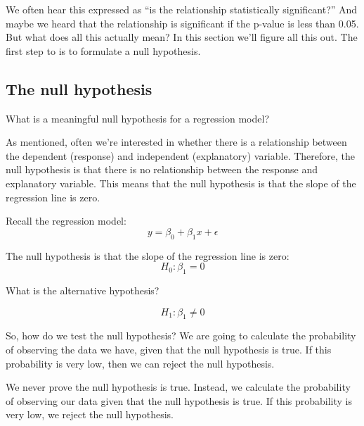 \documentclass[
  letterpaper,
  8pt,
  a4paper]{book}
\begin{document}
We often hear this expressed as ``is the relationship statistically
significant?'' And maybe we heard that the relationship is significant
if the p-value is less than 0.05. But what does all this actually mean?
In this section we'll figure all this out. The first step to is to
formulate a null hypothesis.

\subsection*{The null hypothesis}\label{the-null-hypothesis}

What is a meaningful null hypothesis for a regression model?

As mentioned, often we're interested in whether there is a relationship
between the dependent (response) and independent (explanatory) variable.
Therefore, the null hypothesis is that there is no relationship between
the response and explanatory variable. This means that the null
hypothesis is that the slope of the regression line is zero.

Recall the regression model: \[y = \beta_0 + \beta_1 x + \epsilon\]

The null hypothesis is that the slope of the regression line is zero:
\[H_0: \beta_1 = 0\]

What is the alternative hypothesis?

\[H_1: \beta_1 \neq 0\]

So, how do we test the null hypothesis? We are going to calculate the
probability of observing the data we have, given that the null
hypothesis is true. If this probability is very low, then we can reject
the null hypothesis.

\begin{tcolorbox}[enhanced jigsaw, arc=.35mm, bottomrule=.15mm, bottomtitle=1mm, breakable, colback=white, colbacktitle=quarto-callout-note-color!10!white, colframe=quarto-callout-note-color-frame, coltitle=black, left=2mm, leftrule=.75mm, opacityback=0, opacitybacktitle=0.6, rightrule=.15mm, title=\textcolor{quarto-callout-note-color}{\faInfo}\hspace{0.5em}{Note}, titlerule=0mm, toprule=.15mm, toptitle=1mm]

We never prove the null hypothesis is true. Instead, we calculate the
probability of observing our data given that the null hypothesis is
true. If this probability is very low, we reject the null hypothesis.

\end{tcolorbox}
\end{document}
